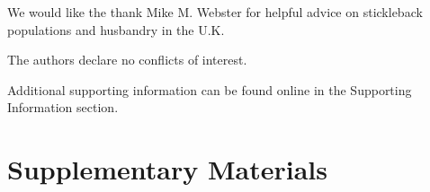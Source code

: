 \documentclass[ASNA,twocolumn]{USG} %
\begin{document}
We would like the thank Mike M. Webster for helpful advice on stickleback populations and husbandry in the U.K. 



The authors declare no conflicts of interest.




Additional supporting information can be found online in the Supporting Information
section.

\onecolumn

\listoffigures
\listoftables


\appendix



\section{Supplementary Materials}\label{sec:suppmat}
\end{document}
